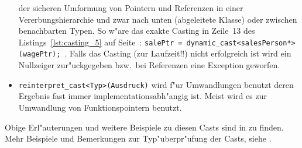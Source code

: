 \begin{itemize}
 der sicheren Umformung von Pointern und Referenzen
 in einer Vererbungshierarchie und zwar nach unten
 (abgeleitete Klasse) oder zwischen benachbarten Typen.
 So w"are das exakte Casting in Zeile~13 des Listings~\ref{lst:casting_5} auf Seite~\pageref{lst:casting_5}:
\verb|salePtr = dynamic_cast<salesPerson*>(wagePtr);|~.
 Falls das Casting (zur Laufzeit!!) nicht erfolgreich ist wird ein Nullzeiger
 zur"uckgegeben bzw.\  bei Referenzen eine Exception geworfen.
%
 \item \verb|reinterpret_cast<Typ>(Ausdruck)|
 wird f"ur Umwandlungen benutzt deren Ergebnis fast immer implementationsabh"angig ist.
 Meist wird es zur Umwandlung von Funktionspointern benutzt.
\end{itemize}
%
Obige Erl"auterungen und weitere Beispiele zu diesen Casts sind in
\cite[\S1.2]{Meyers:1997:MEC}
zu finden. Mehr Beispiele und Bemerkungen zur Typ"uberpr"ufung der Casts,
siehe
\cite[p.246f]{Schmaranz:2002:SCP}.



